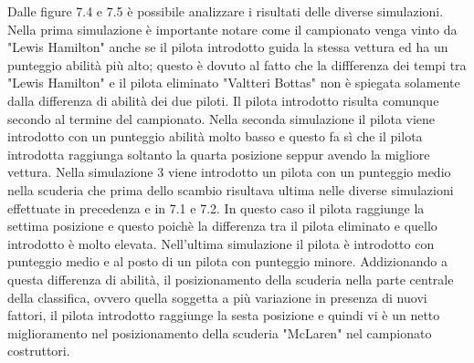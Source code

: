 Dalle figure 7.4 e 7.5 è possibile analizzare i risultati delle diverse simulazioni. Nella prima simulazione è importante notare come il campionato venga vinto da "Lewis Hamilton" anche se il pilota introdotto guida la stessa vettura ed ha un punteggio abilità più alto; questo è dovuto al fatto che la diffferenza dei tempi tra "Lewis Hamilton" e il pilota eliminato "Valtteri Bottas" non è spiegata solamente dalla differenza di abilità dei due piloti. Il pilota introdotto risulta comunque secondo al termine del campionato. Nella seconda simulazione il pilota viene introdotto con un punteggio abilità molto basso e questo fa sì che il pilota introdotta raggiunga soltanto la quarta posizione seppur avendo la migliore vettura. Nella simulazione 3 viene introdotto un pilota con un punteggio medio nella scuderia che prima dello scambio risultava ultima nelle diverse simulazioni effettuate in precedenza e in 7.1 e 7.2. In questo caso il pilota raggiunge la settima posizione e questo poichè la differenza tra il pilota eliminato e quello introdotto è molto elevata. Nell'ultima simulazione il pilota è introdotto con punteggio medio e al posto di un pilota con punteggio minore. Addizionando a questa differenza di abilità, il posizionamento della scuderia nella parte centrale della classifica, ovvero quella soggetta a più variazione in presenza di nuovi fattori, il pilota introdotto raggiunge la sesta posizione e quindi vi è un netto miglioramento nel posizionamento della scuderia "McLaren" nel campionato costruttori.